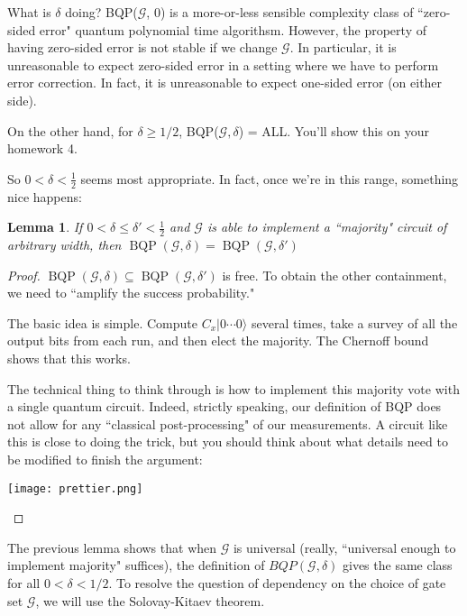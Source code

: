 \documentclass{article}
\newtheorem{lem}[thm]{Lemma}
\newcommand{\ket}[1]{|#1\rangle}
\newcommand{\calG}{\mathcal{G}}
\begin{document}
What is \(\delta\) doing? BQP(\(\calG\), 0) is a more-or-less sensible complexity class of ``zero-sided error" quantum polynomial time algorithsm. However, the property of having zero-sided error is not stable if we change \(\calG\).  In particular, it is unreasonable to expect zero-sided error in a setting where we have to perform error correction.  In fact, it is unreasonable to expect one-sided error (on either side).

On the other hand, for $\delta\ge 1/2$, BQP($\calG, \delta$) = ALL.
You'll show this on your homework 4.

So \(0 < \delta < \frac{1}{2}\) seems most appropriate.  In fact, once we're in this range, something nice happens:

\begin{lem}
    If \(0 < \delta \leq \delta' < \frac{1}{2}\) and $\calG$ is able to implement a ``majority" circuit of arbitrary width, then \(\operatorname{BQP}(\calG, \delta) = \operatorname{BQP}(\calG, \delta')\)
\end{lem}

\begin{proof}
\(\operatorname{BQP}(\calG, \delta) \subseteq \operatorname{BQP}(\calG, \delta')\) is free.  To obtain the other containment, we need to  ``amplify the success probability."

The basic idea is simple. Compute \(C_x\ket{0\dotsb0}\) several times, take a survey of all the output bits from each run, and then elect the majority. The Chernoff bound shows that this works.

The technical thing to think through is how to implement this majority vote with a single quantum circuit.  Indeed, strictly speaking, our definition of BQP does not allow for any ``classical post-processing" of our measurements.  A circuit like this is close to doing the trick, but you should think about what details need to be modified to finish the argument:

\begin{center}
	\texttt{[image: prettier.png]}
\end{center}

\end{proof}

The previous lemma shows that when $\calG$ is universal (really, ``universal enough to implement majority" suffices), the definition of $BQP(\calG,\delta)$ gives the same class for all $0 < \delta < 1/2$.  To resolve the question of dependency on the choice of gate set $\calG$, we will use the Solovay-Kitaev theorem.
\end{document}
